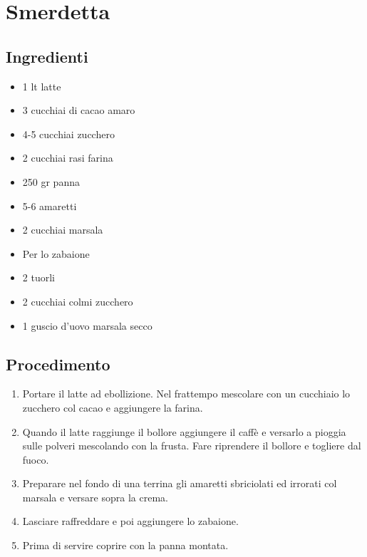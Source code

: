 \section{Smerdetta}
\subsection{Ingredienti}
\begin{itemize}
\item 1 lt latte  
\item 3 cucchiai di cacao amaro  
\item 4-5 cucchiai zucchero  
\item 2 cucchiai rasi farina  
\item 250 gr panna  
\item 5-6 amaretti  
\item 2 cucchiai marsala  
\item Per lo zabaione  
\item 2 tuorli  
\item 2 cucchiai colmi zucchero  
\item 1 guscio d'uovo marsala secco
\end{itemize}
\subsection{Procedimento}
\begin{enumerate}
\item  Portare il latte ad ebollizione. Nel frattempo mescolare con un cucchiaio lo zucchero col cacao e aggiungere la farina.  
\item  Quando il latte raggiunge il bollore aggiungere il caffè e versarlo a pioggia sulle polveri mescolando con la frusta. Fare riprendere il bollore e togliere dal fuoco.  
\item  Preparare nel fondo di una terrina gli amaretti sbriciolati ed irrorati col marsala e versare sopra la crema.  
\item  Lasciare raffreddare e poi aggiungere lo zabaione.  
\item  Prima di servire coprire con la panna montata. 
\end{enumerate}
